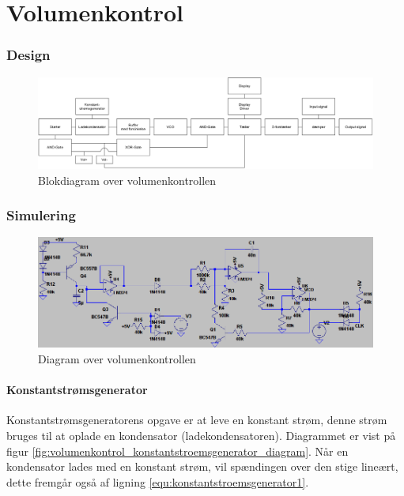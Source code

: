 \chapter{Volumenkontrol}
\label{volumenkontrol}

\subsection{Design}
\label{volumenkontrol-design}

\begin{figure}[h]
\centering
\includegraphics[width=\textwidth]{teknisk/volumenkontrol/blokdiagram.png}
\caption{Blokdiagram over volumenkontrollen}
\label{fig:volumenkontrol_opbygning}
\end{figure}

\subsection{Simulering}
\label{volumenkontrol-simulering}

\begin{figure}[h]
\centering
\includegraphics[width=\textwidth]{teknisk/volumenkontrol/diagram.png}
\caption{Diagram over volumenkontrollen}
\label{fig:volumenkontrol_diagram}
\end{figure}

\subsubsection{Konstantstrømsgenerator}
\label{volumenkontrol-simulering-konstantstroemsgenerator}

Konstantstrømsgeneratorens opgave er at leve en konstant strøm, denne strøm bruges til at oplade en kondensator (ladekondensatoren). Diagrammet er vist på figur \ref{fig:volumenkontrol_konstantstroemsgenerator_diagram}. Når en kondensator lades med en konstant strøm, vil spændingen over den stige lineært, dette fremgår også af ligning \ref{equ:konstantstroemsgenerator1}.

